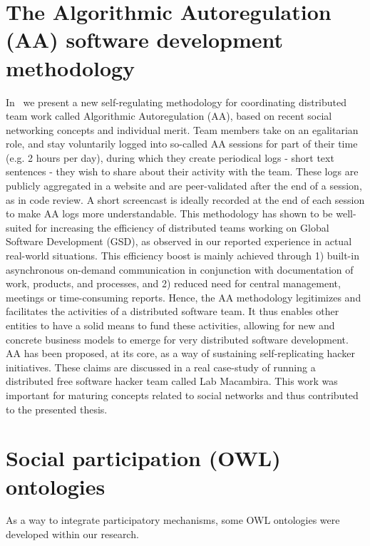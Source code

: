 \begin{apendicesenv}
\section{The Algorithmic Autoregulation (AA) software development methodology}\label{sec:aa}
In~\cite{aaPaper} we present a new self-regulating methodology for coordinating distributed team work called Algorithmic Autoregulation (AA),
based on recent social networking concepts and individual merit.
Team members take on an egalitarian role, and stay voluntarily logged into so-called AA sessions for part of their time 
(e.g. 2 hours per day), during which they create periodical logs - short text sentences - 
they wish to share about their activity with the team.
These logs are publicly aggregated in a website and are peer-validated after the end of a session,
as in code review. 
A short screencast is ideally recorded at the end of each session to make AA logs more understandable.
This methodology has shown to be well-suited for increasing the efficiency of distributed teams working on 
Global Software Development (GSD), as observed in our reported experience in actual real-world situations.
This efficiency boost is mainly achieved through 1) built-in asynchronous on-demand communication in 
conjunction with documentation of work, products, and processes, and 2) reduced need for central management,
meetings or time-consuming reports.
Hence, the AA methodology legitimizes and facilitates the activities of a distributed software team.
It thus enables other entities to have a solid means to fund these activities, 
allowing for new and concrete business models to emerge for very distributed software development. 
AA has been proposed, at its core, as a way of sustaining self-replicating hacker initiatives.
These claims are discussed in a real case-study of running a distributed free software hacker team called Lab Macambira.
This work was important for maturing concepts related to social networks and thus contributed to the presented thesis.

\section{Social participation (OWL) ontologies}
As a way to integrate participatory mechanisms, some OWL ontologies were developed within our research.


\end{apendicesenv}
